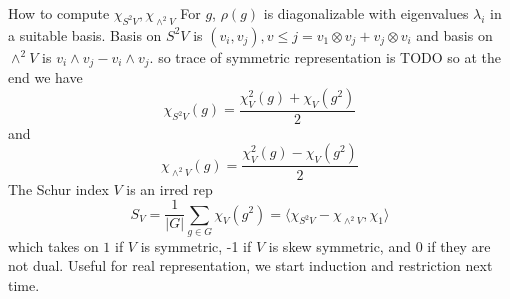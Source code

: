 \documentclass{article}
\theoremstyle{definition}
\theoremstyle{remark}
\theoremstyle{plain}
\begin{document}
How to compute $\chi_{S^2V}, \chi_{\wedge^2 V}$
For $g$, $\rho(g)$ is diagonalizable with eigenvalues $\lambda_i$ in a suitable basis.
Basis on $S^2V$ is $(v_i, v_j), v \leq j = v_1 \otimes v_j + v_j \otimes v_i$ and basis on $\wedge^2 V$ is $v_i\wedge v_j - v_i\wedge v_j $.
so trace of symmetric representation is TODO
so at the end we have 
\[\chi_{S^2 V}(g) = \frac{\chi^2_V(g) + \chi_V(g^2)}{2}\] and 
\[\chi_{\wedge^2 V}(g) = \frac{\chi^2_V(g) - \chi_V(g^2)}{2}\] 
The Schur index $V$ is an irred rep
\[S_{V} = \frac{1}{|G|} \sum_{g\in G} \chi_V(g^2) = \langle\chi_{S^2V} - \chi_{\wedge^2 V}, \chi_1 \rangle\]
which takes on $1$ if $V$ is symmetric, -1 if $V$ is skew symmetric, and 0 if they are not dual.
Useful for real representation, we start induction and restriction next time.
\end{document}
